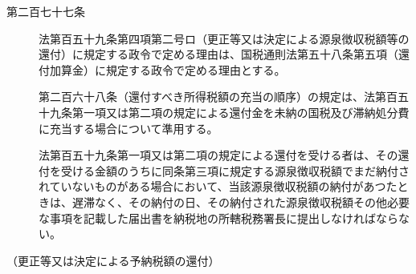 \documentclass[twocolumn,a4j,10pt]{ltjtarticle}
\begin{document}
\begin{description}
\item[第二百七十七条]法第百五十九条第四項第二号ロ（更正等又は決定による源泉徴収税額等の還付）に規定する政令で定める理由は、国税通則法第五十八条第五項（還付加算金）に規定する政令で定める理由とする。
\item[]第二百六十八条（還付すべき所得税額の充当の順序）の規定は、法第百五十九条第一項又は第二項の規定による還付金を未納の国税及び滞納処分費に充当する場合について準用する。
\item[]法第百五十九条第一項又は第二項の規定による還付を受ける者は、その還付を受ける金額のうちに同条第三項に規定する源泉徴収税額でまだ納付されていないものがある場合において、当該源泉徴収税額の納付があつたときは、遅滞なく、その納付の日、その納付された源泉徴収税額その他必要な事項を記載した届出書を納税地の所轄税務署長に提出しなければならない。
\end{description}
\noindent\hspace{10pt}（更正等又は決定による予納税額の還付）
\end{document}
